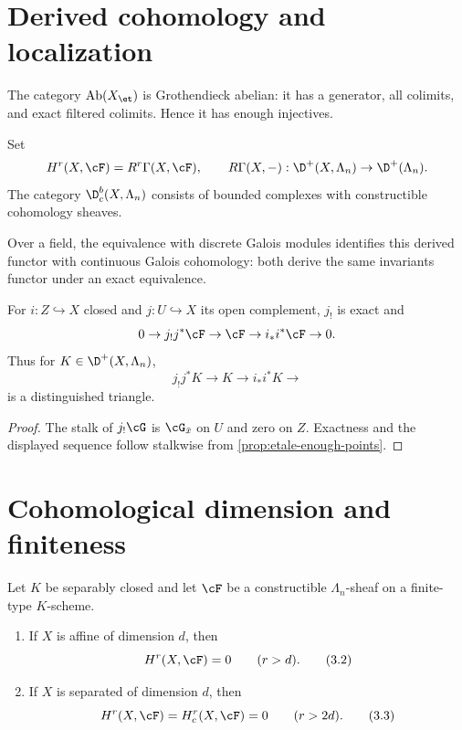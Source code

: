 \section{Derived cohomology and localization}

The category \(\operatorname{Ab}(X_{\et})\) is Grothendieck abelian: it has a
generator, all colimits, and exact filtered colimits.  Hence it has enough
injectives.

\begin{definition}
Set
\[
 H^r(X,\cF)=R^r\Gamma(X,\cF),\qquad
 R\Gamma(X,-):\D^+(X,\Lambda_n)\to\D^+(\Lambda_n).
\]
The category \(\D^b_c(X,\Lambda_n)\) consists of bounded complexes with
constructible cohomology sheaves.
\end{definition}

Over a field, the equivalence with discrete Galois modules identifies this
derived functor with continuous Galois cohomology: both derive the same
invariants functor under an exact equivalence.

\begin{proposition}
\label{prop:torsion-localization}
For \(i:Z\hookrightarrow X\) closed and \(j:U\hookrightarrow X\) its open
complement, \(j_!\) is exact and
\[
 0\to j_!j^*\cF\to\cF\to i_*i^*\cF\to0.
\]
Thus for \(K\in\D^+(X,\Lambda_n)\),
\[
 j_!j^*K\to K\to i_*i^*K\to
\tag{3.1}\label{eq:torsion-localization}
\]
is a distinguished triangle.
\end{proposition}

\begin{proof}
The stalk of \(j_!\cG\) is \(\cG_{\bar x}\) on \(U\) and zero on \(Z\).
Exactness and the displayed sequence follow stalkwise from
\cref{prop:etale-enough-points}.
\end{proof}

\section{Cohomological dimension and finiteness}

\begin{theorem}
\label{thm:artin-vanishing}
Let \(K\) be separably closed and let \(\cF\) be a constructible
\(\Lambda_n\)-sheaf on a finite-type \(K\)-scheme.
\begin{enumerate}
\item If \(X\) is affine of dimension \(d\), then
\[
 H^r(X,\cF)=0\qquad(r>d).
\tag{3.2}\label{eq:artin-affine-vanishing}
\]
\item If \(X\) is separated of dimension \(d\), then
\[
 H^r(X,\cF)=H^r_c(X,\cF)=0\qquad(r>2d).
\tag{3.3}\label{eq:artin-global-bound}
\]
\end{enumerate}
\end{theorem}

